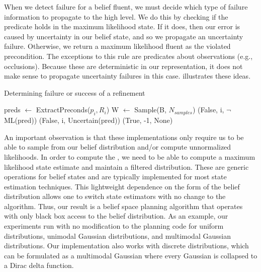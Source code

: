 When we detect failure for a belief fluent, we must decide which type
of failure information to propagate to the high level. We do this by
checking if the predicate holds in the maximum likelihood state. If it
does, then our error is caused by uncertainty in our belief state, and so
we propagate an uncertainty failure. Otherwise, we return a maximum
likelihood fluent as the violated precondition. The exceptions to this
rule are predicates about observations (e.g., occlusions). Because
these are deterministic in our representation, it does not make sense
to propagate uncertainty failures in this case. 
illustrates these ideas.


\begin{algorithm}
 \caption{Determining failure or success of a refinement} \label{alg-bcheck}
 \begin{algorithmic}[1]
          \State preds $\leftarrow $ ExtractPreconds($p_i, R_i$)
          \State W $\leftarrow$ Sample(B, $N_{samples}$)
                     \State \Return (False, i, $\lnot$ML(pred))
                 \Else
                     \State \Return (False, i, Uncertain(pred))
                 \EndIf
              \EndIf
          \EndFor
      \EndFor
      \State \Return (True, -1, None)
  \EndProcedure
 \end{algorithmic}
\end{algorithm}
An important observation is that these implementations only require
us to be able to sample from our belief distribution and/or compute
unnormalized likelihoods. In order to compute the \mld{}, we need to be
able to compute a maximum likelihood state estimate and maintain a
filtered distribution. These are generic operations for belief states
and are typically implemented for most state estimation
techniques. This lightweight dependence on the form of the belief
distribution allows one to switch state estimators with no
change to the algorithm. Thus, our result is a belief space planning
algorithm that operates with only black box access to the belief
distribution. As an example, our experiments run with no modification
to the planning code for uniform distributions, unimodal Gaussian
distributions, and multimodal Gaussian distributions. Our implementation also works with discrete distributions, which can be formulated as a multimodal Gaussian where every Gaussian is collapsed to a Dirac delta function.


